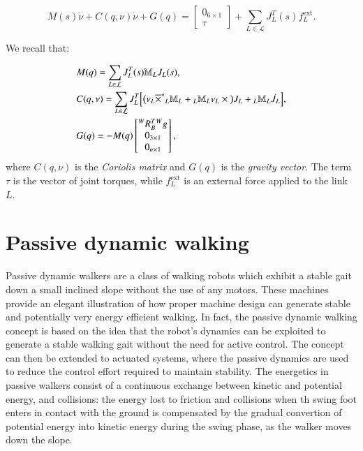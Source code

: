 \begin{equation}\label{def_equations_of_motion_multibody}
    M(s)\dot{\nu} + C(q, \nu)\dot{\nu} + G(q) =
    \begin{bmatrix}
        0_{6\times1}\\
        \tau
    \end{bmatrix}
    + \sum_{L \in \mathcal{L}} J_L^T(s) f_L^{\text{ext}}.
\end{equation}

We recall that:

\begin{equation}
    \begin{aligned}
        &M(q) = \sum_{L \in \mathcal{L}} J_L^T(s) \mathbb{M}_L J_L(s),\\
        &C(q, \nu) = \sum_{L \in \mathcal{L}} J_L^T \Big[ \big( v_L \overline{\times}^{*} {}_L\mathbb{M}_L + {}_L\mathbb{M}_L v_L \times \big) J_L + {}_L\mathbb{M}_L \dot{J_L} \Big], \\
        &G(q) = -M(q)
        \begin{bmatrix}
            {}^{W}{R}_{B}^T {}^{W}{g}_{}\\
            0_{3\times1}\\
            0_{n\times1}
        \end{bmatrix},
    \end{aligned}
\end{equation}
where $C(q, \nu)$ is the \textit{Coriolis matrix} and $G(q)$ is the \textit{gravity vector}.
The term $\tau$ is the vector of joint torques, while $f_L^{\text{ext}}$ is an external force applied to the link $L$.



\chapter{Passive dynamic walking}
Passive dynamic walkers are a class of walking robots which exhibit a stable gait down a small inclined slope without the use of any motors. 
These machines provide an elegant illustration of how proper machine design can generate stable and potentially very energy efficient walking.\cite{Tedrake:2004}
In fact, the passive dynamic walking concept is based on the idea that the robot's dynamics can be exploited to generate a stable walking gait without the need for active control.
The concept can then be extended to actuated systems, where the passive dynamics are used to reduce the control effort required to maintain stability.
The energetics in passive walkers consist of a continuous exchange between kinetic and potential energy, and collisions: the energy lost to friction and collisions when th swing foot enters in contact with the ground is compensated by the gradual convertion of potential energy into kinetic energy during the swing phase, as the walker moves down the slope.

